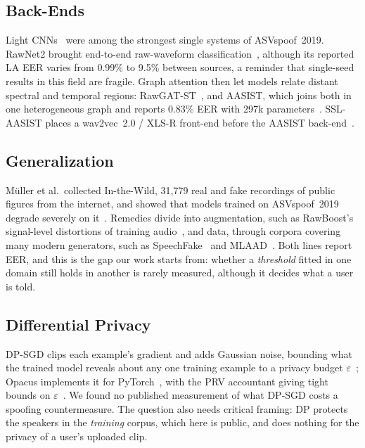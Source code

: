 \documentclass[journal]{IEEEtran}
\begin{document}
\subsection{Back-Ends}
Light CNNs~\cite{lavrentyeva2019stc} were among the strongest single systems
of ASVspoof~2019. RawNet2 brought end-to-end raw-waveform
classification~\cite{tak2021rawnet2}, although its reported LA EER varies
from 0.99\% to 9.5\% between sources, a reminder that single-seed results in
this field are fragile. Graph attention then let models relate distant
spectral and temporal regions: RawGAT-ST~\cite{tak2021rawgat}, and AASIST,
which joins both in one heterogeneous graph and reports 0.83\% EER with 297k
parameters~\cite{jung2022aasist}. SSL-AASIST places a wav2vec~2.0 / XLS-R
front-end before the AASIST back-end~\cite{tak2022ssl}.

\subsection{Generalization}
M\"uller et al.\ collected In-the-Wild, 31{,}779 real and fake recordings of
public figures from the internet, and showed that models trained on
ASVspoof~2019 degrade severely on it~\cite{muller2022itw}. Remedies divide
into augmentation, such as RawBoost's signal-level distortions of
training audio~\cite{tak2022rawboost}, and data, through corpora covering many
modern generators, such as SpeechFake~\cite{speechfake} and
MLAAD~\cite{muller2024mlaad}. Both lines report EER, and this is the gap our
work starts from: whether a \emph{threshold} fitted in one domain still holds
in another is rarely measured, although it decides what a user is told.

\subsection{Differential Privacy}
DP-SGD clips each example's gradient and adds Gaussian noise, bounding what
the trained model reveals about any one training example to a privacy budget
$\varepsilon$~\cite{abadi2016dpsgd}; Opacus implements it for
PyTorch~\cite{yousefpour2021opacus}, with the PRV accountant giving tight
bounds on $\varepsilon$~\cite{gopi2021prv}. We found no published measurement
of what DP-SGD costs a spoofing countermeasure. The question also needs
critical framing: DP protects the speakers in the \emph{training} corpus, which
here is public, and does nothing for the privacy of a user's uploaded clip.
\end{document}
